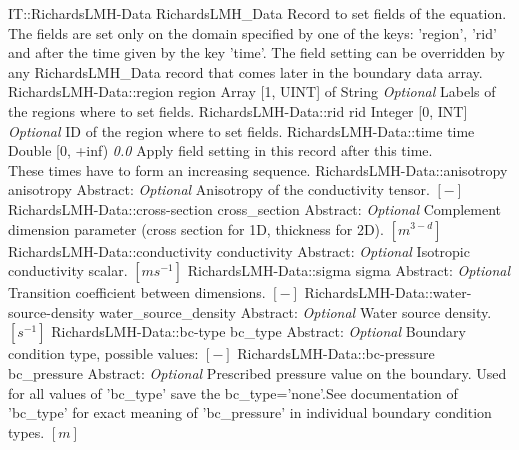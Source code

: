\begin{RecordType}
	{IT::RichardsLMH-Data}
	{RichardsLMH{\_}Data}
	{} %
	{} %
	{{{Record to set fields of the equation.}\\{
The fields are set only on the domain specified by one of the keys: 'region', 'rid'}\\{
and after the time given by the key 'time'. The field setting can be overridden by}\\{
 any RichardsLMH{\_}Data record that comes later in the boundary data array.}}}
		\RecKey
			{RichardsLMH-Data::region}
			{region}
			{{Array [1, UINT] of }{String}}
			{ \it{Optional} }
			{{{Labels of the regions where to set fields. }}}
		\RecKey
			{RichardsLMH-Data::rid}
			{rid}
			{{Integer [0, INT]}}
			{ \it{Optional} }
			{{{ID of the region where to set fields.}}}
		\RecKey
			{RichardsLMH-Data::time}
			{time}
			{{Double [0, +inf)}}
			{ \it{0.0} }
			{{{Apply field setting in this record after this time.}\\{
These times have to form an increasing sequence.}}}
		\RecKey
			{RichardsLMH-Data::anisotropy}
			{anisotropy}
			{{Abstract}{: }}
			{ \it{Optional} }
			{{{Anisotropy of the conductivity tensor. }{$[-]$}}}
		\RecKey
			{RichardsLMH-Data::cross-section}
			{cross{\_}section}
			{{Abstract}{: }}
			{ \it{Optional} }
			{{{Complement dimension parameter (cross section for 1D, thickness for 2D). }{$[m^{3-d}]$}}}
		\RecKey
			{RichardsLMH-Data::conductivity}
			{conductivity}
			{{Abstract}{: }}
			{ \it{Optional} }
			{{{Isotropic conductivity scalar. }{$[ms^{-1}]$}}}
		\RecKey
			{RichardsLMH-Data::sigma}
			{sigma}
			{{Abstract}{: }}
			{ \it{Optional} }
			{{{Transition coefficient between dimensions. }{$[-]$}}}
		\RecKey
			{RichardsLMH-Data::water-source-density}
			{water{\_}source{\_}density}
			{{Abstract}{: }}
			{ \it{Optional} }
			{{{Water source density. }{$[s^{-1}]$}}}
		\RecKey
			{RichardsLMH-Data::bc-type}
			{bc{\_}type}
			{{Abstract}{: }}
			{ \it{Optional} }
			{{{Boundary condition type, possible values: }{$[-]$}}}
		\RecKey
			{RichardsLMH-Data::bc-pressure}
			{bc{\_}pressure}
			{{Abstract}{: }}
			{ \it{Optional} }
			{{{Prescribed pressure value on the boundary. Used for all values of 'bc{\_}type' save the bc{\_}type='none'.See documentation of 'bc{\_}type' for exact meaning of 'bc{\_}pressure' in individual boundary condition types. }{$[m]$}}}

\end{RecordType}
